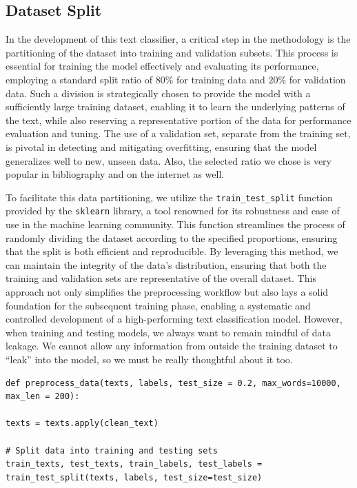 \subsection{Dataset Split}
In the development of this text classifier, a critical step in the methodology is the partitioning of the dataset into training and validation subsets.
This process is essential for training the model effectively and evaluating its performance, employing a standard split ratio of $80\%$ for training data and $20\%$ for validation data.
Such a division is strategically chosen to provide the model with a sufficiently large training dataset, enabling it to learn the underlying patterns of the text, while also reserving a representative portion of the data for performance evaluation and tuning.
The use of a validation set, separate from the training set, is pivotal in detecting and mitigating overfitting, ensuring that the model generalizes well to new, unseen data.
Also, the selected ratio we chose is very popular in bibliography and on the internet as well.

To facilitate this data partitioning, we utilize the \verb|train_test_split| function provided by the \verb|sklearn| library, a tool renowned for its robustness and ease of use in the machine learning community. This function streamlines the process of randomly dividing the dataset according to the specified proportions, ensuring that the split is both efficient and reproducible. By leveraging this method, we can maintain the integrity of the data's distribution, ensuring that both the training and validation sets are representative of the overall dataset. This approach not only simplifies the preprocessing workflow but also lays a solid foundation for the subsequent training phase, enabling a systematic and controlled development of a high-performing text classification model. However, when training and testing models, we always want to remain mindful of data leakage. We cannot allow any information from outside the training dataset to “leak” into the model, so we must be really thoughtful about it too. \\

\begin{lstlisting}
def preprocess_data(texts, labels, test_size = 0.2, max_words=10000, max_len = 200):
	
texts = texts.apply(clean_text)
	
# Split data into training and testing sets
train_texts, test_texts, train_labels, test_labels = train_test_split(texts, labels, test_size=test_size)
\end{lstlisting}

